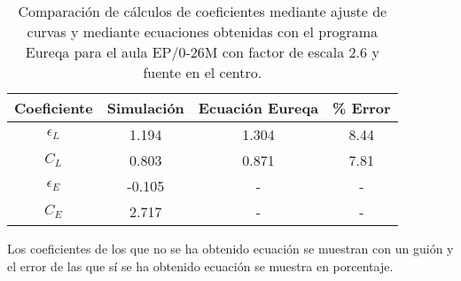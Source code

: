\begin{table}[ht]
\centering
{
\begin{tabular}{@{}cccc@{}}
\toprule
Coeficiente & Simulación & Ecuación Eureqa & \% Error \\ \midrule
$\epsilon_L$ & 1.194 & 1.304 & 8.44 \\
$C_L$ & 0.803 & 0.871 & 7.81 \\
$\epsilon_E$ & -0.105 & - & - \\
$C_E$ & 2.717 & - & - \\ \bottomrule
\end{tabular}
}
\caption{Comparación de cálculos de coeficientes mediante ajuste de curvas y mediante ecuaciones obtenidas con el programa Eureqa para el aula EP/0-26M con factor de escala 2.6 y fuente en el centro.}
\label{tab:comparaecuscentro}
\vspace{-0.5cm}
\end{table}
\FloatBarrier



Los coeficientes de los que no se ha obtenido ecuación se muestran con un guión y el error de las que sí se ha obtenido ecuación se muestra en porcentaje.





